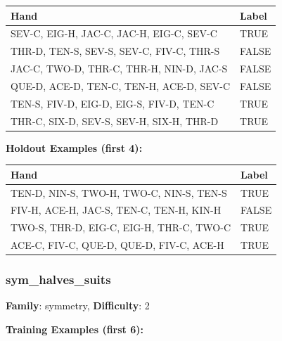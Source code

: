 \documentclass[10pt,a4paper]{article}
\begin{document}
\begin{small}
\begin{tabular}{p{8cm}l}
\toprule
Hand & Label \\
\midrule
SEV-C, EIG-H, JAC-C, JAC-H, EIG-C, SEV-C & \textcolor{positive}{TRUE} \\
THR-D, TEN-S, SEV-S, SEV-C, FIV-C, THR-S & \textcolor{negative}{FALSE} \\
JAC-C, TWO-D, THR-C, THR-H, NIN-D, JAC-S & \textcolor{negative}{FALSE} \\
QUE-D, ACE-D, TEN-C, TEN-H, ACE-D, SEV-C & \textcolor{negative}{FALSE} \\
TEN-S, FIV-D, EIG-D, EIG-S, FIV-D, TEN-C & \textcolor{positive}{TRUE} \\
THR-C, SIX-D, SEV-S, SEV-H, SIX-H, THR-D & \textcolor{positive}{TRUE} \\
\bottomrule
\end{tabular}
\end{small}

\textbf{Holdout Examples (first 4):}

\begin{small}
\begin{tabular}{p{8cm}l}
\toprule
Hand & Label \\
\midrule
TEN-D, NIN-S, TWO-H, TWO-C, NIN-S, TEN-S & \textcolor{positive}{TRUE} \\
FIV-H, ACE-H, JAC-S, TEN-C, TEN-H, KIN-H & \textcolor{negative}{FALSE} \\
TWO-S, THR-D, EIG-C, EIG-H, THR-C, TWO-C & \textcolor{positive}{TRUE} \\
ACE-C, FIV-C, QUE-D, QUE-D, FIV-C, ACE-H & \textcolor{positive}{TRUE} \\
\bottomrule
\end{tabular}
\end{small}

\vspace{0.5cm}

\subsubsection{sym\_halves\_suits}

\textbf{Family}: symmetry, \textbf{Difficulty}: 2

\textbf{Training Examples (first 6):}
\end{document}
